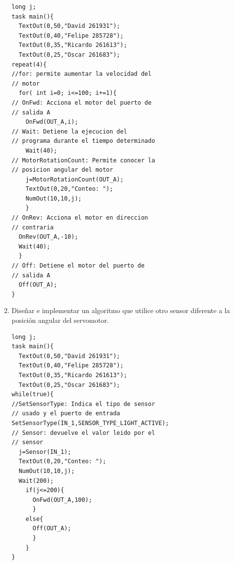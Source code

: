 \documentclass[twocolumn]{IEEEtran}
\begin{document}
\begin{enumerate}
\lstset{numbers=left, numberstyle=\tiny, stepnumber=1, numbersep=1pt}
\begin{lstlisting}[firstnumber=1, caption=Código Velocidad, label=code1]
  long j;
task main(){
  TextOut(0,50,"David 261931");
  TextOut(0,40,"Felipe 285728");
  TextOut(0,35,"Ricardo 261613");
  TextOut(0,25,"Oscar 261683");
repeat(4){
//for: permite aumentar la velocidad del
// motor
  for( int i=0; i<=100; i+=1){
// OnFwd: Acciona el motor del puerto de
// salida A
    OnFwd(OUT_A,i);
// Wait: Detiene la ejecucion del 
// programa durante el tiempo determinado
    Wait(40);
// MotorRotationCount: Permite conocer la
// posicion angular del motor
    j=MotorRotationCount(OUT_A);
    TextOut(0,20,"Conteo: ");
    NumOut(10,10,j);
    }
// OnRev: Acciona el motor en direccion
// contraria
  OnRev(OUT_A,-10);
  Wait(40);
  }
// Off: Detiene el motor del puerto de
// salida A
  Off(OUT_A);
}
\end{lstlisting}

 \item  Diseñar e implementar un algoritmo que utilice otro sensor diferente a la posición angular del servomotor.
\lstset{numbers=left, numberstyle=\tiny, stepnumber=1, numbersep=1pt}
\begin{lstlisting}[firstnumber=1, caption=Código Sensor de Intensidad de Luz, label=code1]
  long j;
task main(){
  TextOut(0,50,"David 261931");
  TextOut(0,40,"Felipe 285728");
  TextOut(0,35,"Ricardo 261613");
  TextOut(0,25,"Oscar 261683");
while(true){
//SetSensorType: Indica el tipo de sensor
// usado y el puerto de entrada
SetSensorType(IN_1,SENSOR_TYPE_LIGHT_ACTIVE);
// Sensor: devuelve el valor leido por el
// sensor
  j=Sensor(IN_1);
  TextOut(0,20,"Conteo: ");
  NumOut(10,10,j);
  Wait(200);
    if(j<=200){
      OnFwd(OUT_A,100);
      }
    else{
      Off(OUT_A);
      }
    }
}
\end{lstlisting}
\end{enumerate}
\end{document}
